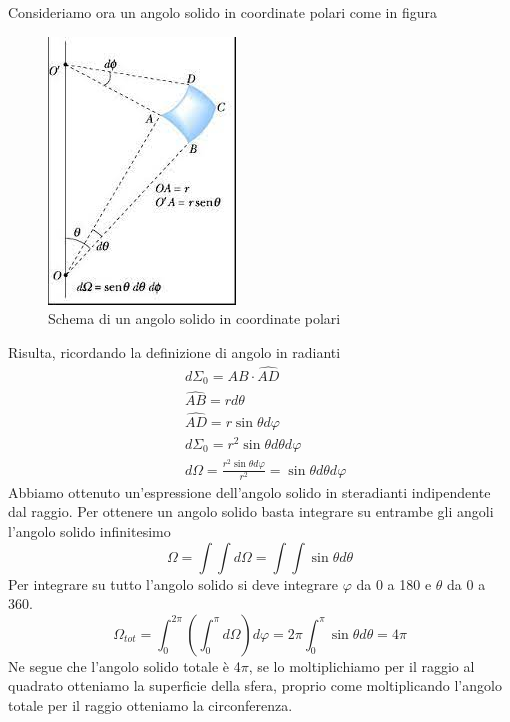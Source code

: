 \documentclass[
10pt, %
a4paper, %
oneside, %
headinclude,footinclude, %
BCOR5mm, %
]{scrartcl}
\begin{document}
Consideriamo ora un angolo solido in coordinate polari come in figura 
\begin{figure}[h!]
	\centering
	\includegraphics[width=0.3\linewidth]{../images/angolo_solido}
	\caption{Schema di un angolo solido in coordinate polari}
	\label{fig:angolosolido}
\end{figure}
\FloatBarrier
Risulta, ricordando la definizione di angolo in radianti
\begin{align*}
	&d\Sigma_0 = \hat{AB}\cdot\hat{AD}\\
	&\hat{AB}=rd\theta\\
	&\hat{AD}=r\sin\theta d\varphi\\
	&d\Sigma_0 = r^2\sin\theta d\theta d\varphi\\
	&d\Omega = \frac{r^2 \sin\theta d\varphi}{r^2} = \sin\theta d\theta d\varphi
\end{align*}
Abbiamo ottenuto un'espressione dell'angolo solido in steradianti indipendente dal raggio. Per ottenere un angolo solido basta integrare su entrambe gli angoli l'angolo solido infinitesimo
\[\Omega = \int\int d\Omega = \int \int \sin\theta d\theta\]
Per integrare su tutto l'angolo solido si deve integrare \(\varphi\) da 0 a 180 e $\theta$ da 0 a 360. 
\[\Omega_{tot} = \int^{2\pi}_{0}\left(\int^{\pi}_{0} d\Omega\right)d\varphi = 2\pi \int^\pi_{0} \sin\theta d\theta = 4\pi\]
Ne segue che l'angolo solido totale è 4$\pi$, se lo moltiplichiamo per il raggio al quadrato otteniamo la superficie della sfera, proprio come moltiplicando l'angolo totale per il raggio otteniamo la circonferenza.\\\\
\end{document}
